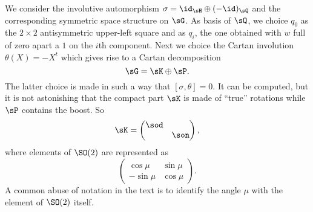 We consider the involutive automorphism $\sigma=\id_{\sH}\oplus(-\id)_{\sQ}$ and the corresponding symmetric space structure on $\sG$. As basis of $\sQ$, we choice $q_0$ as the $2\times 2$ antisymmetric upper-left square and as $q_i$, the one obtained with $w$ full of zero apart a $1$ on the $i$th component.
Next we choice the Cartan involution $\theta(X)=-X^t$ which gives rise to a Cartan decomposition
\[
\sG=\sK\oplus\sP.
\]
The latter choice is made in such a way that $[\sigma,\theta]=0$.  It can be computed, but it is not astonishing that the compact part $\sK$ is made of  ``true'' rotations while $\sP$ contains the boost. So
\[
  \sK=
\begin{pmatrix}
  \sod\\
&\son
\end{pmatrix},
\]
where elements of $\SO(2)$ are represented as
\[ 
  \begin{pmatrix}
\cos\mu&\sin\mu\\
-\sin\mu&\cos\mu
\end{pmatrix}.
\]
A common abuse of notation in the text is to identify the angle $\mu$ with the element of $\SO(2)$ itself.

